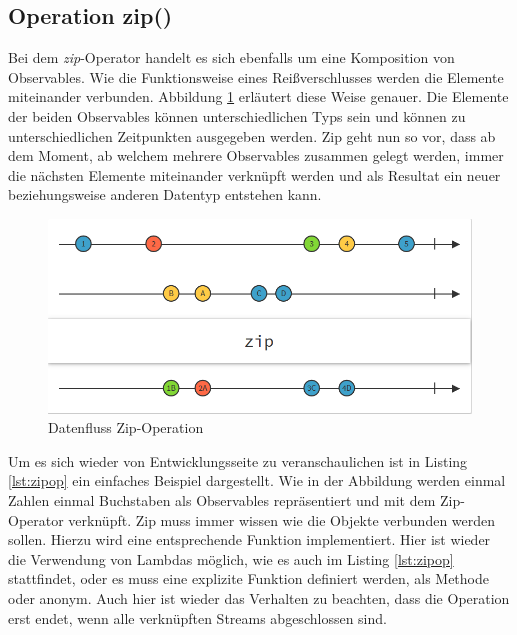 \subsection{Operation zip()}
Bei dem \textit{zip}-Operator handelt es sich ebenfalls um eine Komposition von Observables. Wie die Funktionsweise eines Reißverschlusses werden die Elemente miteinander verbunden. Abbildung \ref{pic:zipop} erläutert diese Weise genauer. Die Elemente der beiden Observables können unterschiedlichen Typs sein und können zu unterschiedlichen Zeitpunkten ausgegeben werden. Zip geht nun so vor, dass ab dem Moment, ab welchem mehrere Observables zusammen gelegt werden, immer die nächsten Elemente miteinander verknüpft werden und als Resultat ein neuer beziehungsweise anderen Datentyp entstehen kann.
\begin{figure}
	\centering
	\includegraphics[width=1\textwidth]{Abb/zip}
	\caption{Datenfluss Zip-Operation}
	\label{pic:zipop}
\end{figure}
 
Um es sich wieder von Entwicklungsseite zu veranschaulichen ist in Listing \ref{lst:zipop} ein einfaches Beispiel dargestellt. Wie in der Abbildung werden einmal Zahlen einmal Buchstaben als Observables repräsentiert und mit dem Zip-Operator verknüpft. Zip muss immer wissen wie die Objekte verbunden werden sollen. Hierzu wird eine entsprechende Funktion implementiert. Hier ist wieder die Verwendung von Lambdas möglich, wie es auch im Listing \ref{lst:zipop} stattfindet, oder es muss eine explizite Funktion definiert werden, als Methode oder anonym. Auch hier ist wieder das Verhalten zu beachten, dass die Operation erst endet, wenn alle verknüpften Streams abgeschlossen sind. 